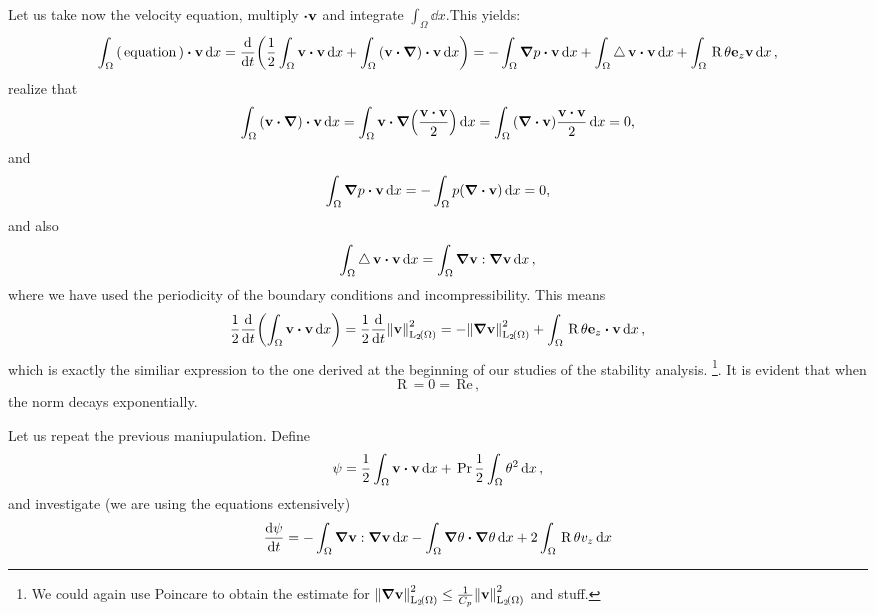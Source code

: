\documentclass[reqno, a4paper]{article}
\begin{document}
Let us take now the velocity equation, multiply $\vdot \vb{v}$ and integrate $\int_{\Omega}\dd{x}$.This yields:
\[
	\int_{\Omega}\qty(\, \text{equation} \,) \vdot \vb{v}\dd{x} = \dv{t}\qty(\frac{1}{2}\int_{\Omega}\vb{v} \vdot \vb{v}\dd{x} + \int_{\Omega}\qty(\vb{v}\vdot \grad)\vdot \vb{v}\dd{x}) = - \int_{\Omega}\grad p \vdot \vb{v}\dd{x} + \int_{\Omega}\laplace \vb{v} \vdot \vb{v}\dd{x} + \int_{\Omega}\, \text{R} \,\theta \vb{e}_z \vb{v}\dd{x},
\]
realize that
\[
	\int_{\Omega}\qty(\vb{v}\vdot \grad) \vdot\vb{v}\dd{x} = \int_{\Omega}\vb{v}\vdot \grad\qty(\frac{\vb{v}\vdot \vb{v}}{2})\dd{x} = \int_{\Omega}\qty(\divergence{\vb{v}})\frac{\vb{v}\vdot \vb{v}}{2}\dd{x} = 0,
\]
and
\[
	\int_{\Omega}\grad p \vdot \vb{v}\dd{x} = - \int_{\Omega}p \qty(\divergence{\vb{v}})\dd{x} = 0,
\]
and also
\[
	\int_{\Omega}\laplace \vb{v}\vdot \vb{v}\dd{x} = \int_{\Omega}\grad \vb{v} : \grad\vb{v}\dd{x},
\]
where we have used the periodicity of the boundary conditions and incompressibility.
This means
\[
	\frac{1}{2} \dv{t}\qty(\int_{\Omega}\vb{v}\vdot \vb{v}\dd{x}) = \frac{1}{2} \dv{t} \norm{\vb{v}}_{\LpSet[2]{\Omega}}^{2} = - \norm{\grad \vb{v}}_{\LpSet[2]{\Omega}}^{2} + \int_{\Omega}\, \text{R} \, \theta \vb{e}_z \vdot \vb{v}\dd{x},
\]
which is exactly the similiar expression to the one derived at the beginning of our studies of the stability analysis. \footnote{We could again use Poincare to obtain the estimate for $\norm{\grad \vb{v}}_{\LpSet[2]{\Omega}}^{2} \leq \frac{1}{C_p} \norm{\vb{v}}_{\LpSet[2]{\Omega}}^{2}$ and stuff.}. It is evident that when
\[
	\, \text{R} \, = 0 = \, \text{Re} \,,
\]
the norm decays exponentially. 

Let us repeat the previous maniupulation. Define
\[
	\psi = \frac{1}{2}\int_{\Omega}\vb{v}\vdot \vb{v}\dd{x} + \, \text{Pr} \, \frac{1}{2} \int_{\Omega}\theta^{2}\dd{x},
\]
and investigate (we are using the equations extensively)
\[
	\dv{\psi}{t} = -\int_{\Omega}\grad \vb{v} : \grad \vb{v}\dd{x} - \int_{\Omega}\grad \theta \vdot \grad \theta\dd{x} + 2\int_{\Omega}\, \text{R} \, \theta v_z\dd{x}
\]
\end{document}
